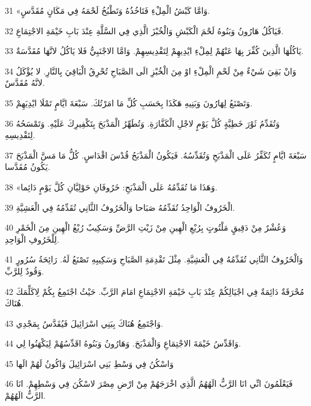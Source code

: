 \par 31 «وَامَّا كَبْشُ الْمِلْءِ فَتَاخُذُهُ وَتَطْبُخُ لَحْمَهُ فِي مَكَانٍ مُقَدَّسٍ.
\par 32 فَيَاكُلُ هَارُونُ وَبَنُوهُ لَحْمَ الْكَبْشِ وَالْخُبْزَ الَّذِي فِي السَّلَّةِ عِنْدَ بَابِ خَيْمَةِ الاجْتِمَاعِ.
\par 33 يَاكُلُهَا الَّذِينَ كُفِّرَ بِهَا عَنْهُمْ لِمِلْءِ ايْدِيهِمْ لِتَقْدِيسِهِمْ. وَامَّا الاجْنَبِيُّ فَلا يَاكُلُ لانَّهَا مُقَدَّسَةٌ.
\par 34 وَانْ بَقِيَ شَيْءٌ مِنْ لَحْمِ الْمِلْءِ اوْ مِنَ الْخُبْزِ الَى الصَّبَاحِ تُحْرِقُ الْبَاقِيَ بِالنَّارِ. لا يُؤْكَلُ لانَّهُ مُقَدَّسٌ.
\par 35 وَتَصْنَعُ لِهَارُونَ وَبَنِيهِ هَكَذَا بِحَسَبِ كُلِّ مَا امَرْتُكَ. سَبْعَةَ ايَّامٍ تَمْلَا ايْدِيَهِمْ.
\par 36 وَتُقَدِّمُ ثَوْرَ خَطِيَّةٍ كُلَّ يَوْمٍ لاجْلِ الْكَفَّارَةِ. وَتُطَهِّرُ الْمَذْبَحَ بِتَكْفِيرِكَ عَلَيْهِ. وَتَمْسَحُهُ لِتَقْدِيسِهِ.
\par 37 سَبْعَةَ ايَّامٍ تُكَفِّرُ عَلَى الْمَذْبَحِ وَتُقَدِّسُهُ. فَيَكُونُ الْمَذْبَحُ قُدْسَ اقْدَاسٍ. كُلُّ مَا مَسَّ الْمَذْبَحَ يَكُونُ مُقَدَّسا.
\par 38 «وَهَذَا مَا تُقَدِّمُهُ عَلَى الْمَذْبَحِ: خَرُوفَانِ حَوْلِيَّانِ كُلَّ يَوْمٍ دَائِما.
\par 39 الْخَرُوفُ الْوَاحِدُ تُقَدِّمُهُ صَبَاحا وَالْخَرُوفُ الثَّانِي تُقَدِّمُهُ فِي الْعَشِيَّةِ.
\par 40 وَعُشْرٌ مِنْ دَقِيقٍ مَلْتُوتٍ بِرُبْعِ الْهِينِ مِنْ زَيْتِ الرَّضِّ وَسَكِيبٌ رُبْعُ الْهِينِ مِنَ الْخَمْرِ لِلْخَرُوفِ الْوَاحِدِ.
\par 41 وَالْخَرُوفُ الثَّانِي تُقَدِّمُهُ فِي الْعَشِيَّةِ. مِثْلَ تَقْدِمَةِ الصَّبَاحِ وَسَكِيبِهِ تَصْنَعُ لَهُ. رَائِحَةُ سُرُورٍ وَقُودٌ لِلرَّبِّ.
\par 42 مُحْرَقَةٌ دَائِمَةٌ فِي اجْيَالِكُمْ عِنْدَ بَابِ خَيْمَةِ الاجْتِمَاعِ امَامَ الرَّبِّ. حَيْثُ اجْتَمِعُ بِكُمْ لِاكَلِّمَكَ هُنَاكَ.
\par 43 وَاجْتَمِعُ هُنَاكَ بِبَنِي اسْرَائِيلَ فَيُقَدَّسُ بِمَجْدِي.
\par 44 وَاقَدِّسُ خَيْمَةَ الاجْتِمَاعِ وَالْمَذْبَحَ. وَهَارُونُ وَبَنُوهُ اقَدِّسُهُمْ لِيَكْهَنُوا لِي.
\par 45 وَاسْكُنُ فِي وَسْطِ بَنِي اسْرَائِيلَ وَاكُونُ لَهُمْ الَها
\par 46 فَيَعْلَمُونَ انِّي انَا الرَّبُّ الَهُهُمُ الَّذِي اخْرَجَهُمْ مِنْ ارْضِ مِصْرَ لاسْكُنَ فِي وَسْطِهِمْ. انَا الرَّبُّ الَهُهُمْ.

